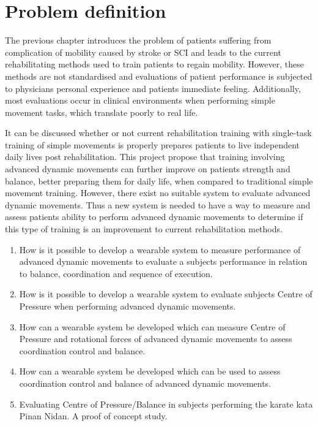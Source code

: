 \section{Problem definition}

The previous chapter introduces the problem of patients suffering from complication of mobility caused by stroke or SCI and leads to the current rehabilitating methods used to train patients to regain mobility. 
However, these methods are not standardised and evaluations of patient performance is subjected to physicians personal experience and patients immediate feeling. Additionally, most evaluations occur in clinical environments when performing simple movement tasks, which translate poorly to real life. 

It can be discussed whether or not current rehabilitation training with single-task training of simple movements is properly prepares patients to live independent daily lives post rehabilitation. This project propose that training involving advanced dynamic movements can further improve on patients strength and balance, better preparing them for daily life, when compared to traditional simple movement training. 
However, there exist no suitable system to evaluate advanced dynamic movements. Thus a new system is needed to have a way to measure and assess patients ability to perform advanced dynamic movements to determine if this type of training is an improvement to current rehabilitation methods.


\begin{center}
	\begin{enumerate} 
\item How is it possible to develop a wearable system to measure performance of advanced dynamic movements to evaluate a subjects performance in relation to balance, coordination and sequence of execution.

\item How is it possible to develop a wearable system to evaluate subjects Centre of Pressure when performing advanced dynamic movements.

\item How can a wearable system be developed which can measure Centre of Pressure and rotational forces of advanced dynamic movements to assess coordination control and balance.

\item How can a wearable system be developed which can be used to assess coordination control and balance of advanced dynamic movements.

\item Evaluating Centre of Pressure/Balance in subjects performing the karate kata Pinan Nidan. A proof of concept study. 
\end{enumerate}
\end{center}
